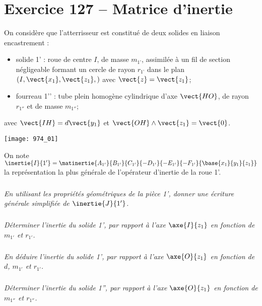 \section*{Exercice 127 -- Matrice d'inertie}
\setcounter{exo}{0}
On considère que l’atterrisseur est constitué de deux solides en liaison encastrement :
\begin{itemize}
\item solide 1’ : roue de centre $I$, de masse $m_{1’}$, assimilée à un fil de section négligeable formant un cercle de rayon $r_{1’}$ dans le plan $\left(I,\vect{x_1},\vect{z_1}, \right)$ avec $\vect{z}=\vect{z_1}$;
\item fourreau 1’’ : tube plein homogène cylindrique d’axe $\vect{HO}$, de rayon $r_{1''}$ et de masse $m_{1''}$;
 \end{itemize}
avec $\vect{IH}=d\vect{y_1}$ et $\vect{OH}\wedge \vect{z_1}=\vect{0}$.

\begin{center}
\texttt{[image: 974\_01]}%
\end{center}


On note $\inertie{I}{1'}=\matinertie{A_{1'}}{B_{1'}}{C_{1'}}{-D_{1'}}{-E_{1'}}{-F_{1'}}{\base{x_1}{y_1}{z_1}}$ 
la représentation la plus générale de l’opérateur d’inertie de la roue 1'.


\subparagraph{}
\textit{En utilisant les propriétés géométriques de la pièce 1’, donner une écriture générale simplifiée de $\inertie{J}{1'}$.}
\ifprof
\begin{corrige}
\end{corrige}
\else
\fi

\subparagraph{}
\textit{Déterminer l’inertie du solide 1’, par rapport à l’axe $\axe{I}{z_1}$ en fonction de $m_{1'}$ et $r_{1'}$.}
\ifprof
\begin{corrige}
\end{corrige}
\else
\fi

\subparagraph{}
\textit{En déduire l’inertie du solide 1’, par rapport à l’axe $\axe{O}{z_1}$ en fonction de $d$, $m_{1'}$ et $r_{1'}$.}
\ifprof
\begin{corrige}
\end{corrige}
\else
\fi

\subparagraph{}
\textit{Déterminer l’inertie du solide 1'', par rapport à l’axe $\axe{O}{z_1}$ en fonction de $m_{1''}$ et $r_{1''}$.}
\ifprof
\begin{corrige}
\end{corrige}
\else
\fi



